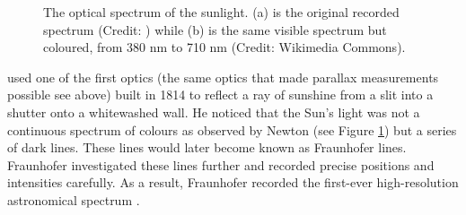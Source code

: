\begin{figure}[!htb]
    \centering
    \vfill
    \vfill
    \caption{The optical spectrum of the sunlight. (a) is the original recorded spectrum (Credit: \citet{fraunhofer_first_1817}) while (b) is the same visible spectrum but coloured, from 380 nm to 710 nm (Credit: Wikimedia Commons).} 
    \label{fig:Fraunhofer_lines}
\end{figure}

\citet{fraunhofer_first_1817} used one of the first optics (the same optics that made parallax measurements possible see above) built in 1814 to reflect a ray of sunshine from a slit into a shutter onto a whitewashed wall. 
He noticed that the Sun's light was not a continuous spectrum of colours as observed by Newton \cite{newton_new_1993} 
(see Figure \ref{fig:Fraunhofer_lines}) but a series of dark lines. These lines would later become known as Fraunhofer 
lines. Fraunhofer investigated these lines further and recorded precise positions and intensities 
carefully. As a result, Fraunhofer recorded the first-ever high-resolution astronomical spectrum \cite{tennyson_astronomical_2005}.

